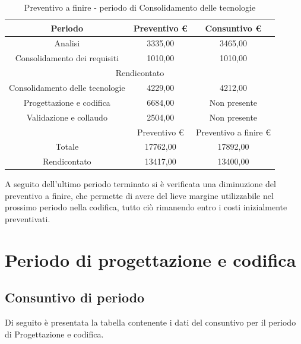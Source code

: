 \documentclass[./PianodiProgetto.tex]{subfiles}
\begin{document}
\begin{table}[H]
	\centering
	\begin{tabular}{|c|c|c|}
		\hline
		Periodo&Preventivo \euro{}&Consuntivo \euro{} \\ \hline
		Analisi&3335,00&3465,00  \\ \hline
		Consolidamento dei requisiti&1010,00&1010,00  \\ \hline
		\multicolumn{3}{|c|}{Rendicontato}  \\ \hline
		Consolidamento delle tecnologie&4229,00&4212,00  \\ \hline
		Progettazione e codifica&6684,00&Non presente  \\ \hline
		Validazione e collaudo&2504,00&Non presente  \\ \hline
		 &Preventivo \euro{}&Preventivo a finire \euro{}  \\ \hline
		Totale&17762,00&17892,00 \\ \hline
		Rendicontato&13417,00&13400,00 \\ \hline
	\end{tabular}
	\caption{Preventivo a finire - periodo di Consolidamento delle tecnologie}
\end{table}

\noindent A seguito dell'ultimo periodo terminato si è verificata una diminuzione del preventivo a finire, che permette di avere del lieve margine utilizzabile nel prossimo periodo nella codifica, tutto ciò rimanendo entro i costi inizialmente preventivati.

\section{Periodo di progettazione e codifica}
\subsection{Consuntivo di periodo}
Di seguito è presentata la tabella contenente i dati del consuntivo per il
periodo di Progettazione e codifica.
\end{document}
